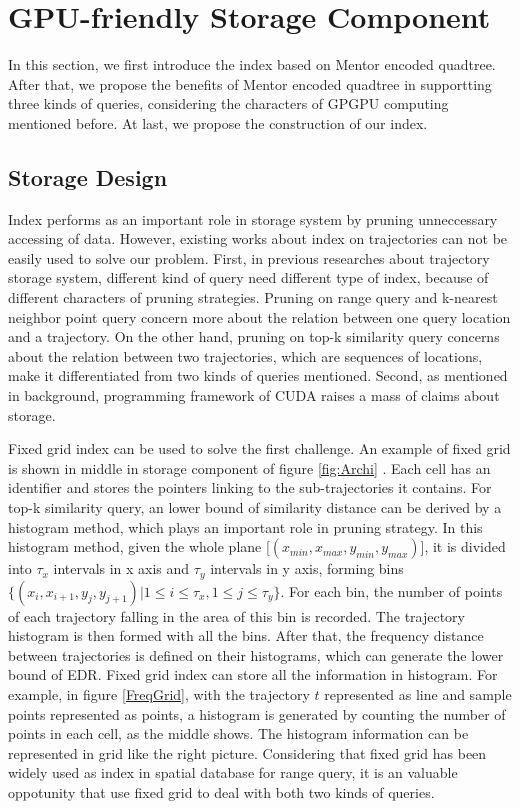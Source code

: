 \documentclass[conference]{IEEEtran}
\begin{document}
\section{GPU-friendly Storage Component}
In this section, we first introduce the index based on Mentor encoded quadtree. After that, we propose the benefits of Mentor encoded quadtree in supportting three kinds of queries, considering the characters of GPGPU computing mentioned before. At last, we propose the construction of our index.

\subsection{Storage Design}

Index performs as an important role in storage system by pruning unneccessary accessing of data. However, existing works about index on trajectories can not be easily used to solve our problem. First, in previous researches about trajectory storage system, different kind of query need different type of index, because of different characters of pruning strategies. Pruning on range query and k-nearest neighbor point query concern more about the relation between one query location and a trajectory. On the other hand, pruning on top-k similarity query concerns about the relation between two trajectories, which are sequences of locations, make it differentiated from two kinds of queries mentioned. Second, as mentioned in background, programming framework of CUDA raises a mass of claims about storage.

Fixed grid index can be used to solve the first challenge. An example of fixed grid is shown in middle in storage component of figure \ref{fig:Archi} . Each cell has an identifier and stores the pointers linking to the sub-trajectories it contains. For top-k similarity query, an lower bound of similarity distance can be derived by a histogram method\cite{DBLP:conf/sigmod/ChenOO05}, which plays an important role in pruning strategy. In this histogram method, given the whole plane [$(x_{min},x_{max},y_{min},y_{max})$], it is divided into $\tau_{x}$ intervals in x axis and $\tau_{y}$ intervals in y axis, forming bins $\{(x_{i},x_{i+1},y_{j},y_{j+1})|1 \leq i\leq \tau_{x},1 \leq j\leq \tau_{y}\}$. For each bin, the number of points of each trajectory falling in the area of this bin is recorded. The trajectory histogram is then formed with all the bins. After that, the frequency distance between trajectories is defined on their histograms, which can generate the lower bound of EDR. Fixed grid index can store all the information in histogram. For example, in figure \ref{FreqGrid}, with the trajectory $t$ represented as line and sample points represented as points, a histogram is generated by counting the number of points in each cell, as the middle shows. The histogram information can be represented in grid like the right picture. Considering that fixed grid has been widely used as index in spatial database for range query, it is an valuable oppotunity that use fixed grid to deal with both two kinds of queries. 
\end{document}

